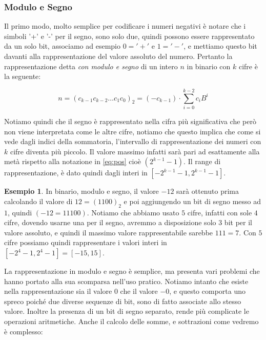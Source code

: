 \documentclass[a4paper]{book}
\theoremstyle{definition}
\newtheorem{ex}{Esempio}
\newcommand{\nota}[1]{\marginpar[{\raggedleft\small\sffamily #1\\}]{%
 								 {\raggedright\small\sffamily #1\\}}}
\begin{document}
\subsubsection{Modulo e Segno}

Il primo modo, molto semplice per codificare i numeri negativi è notare che i simboli '+' e '-' per il segno, sono solo due, quindi possono essere rappresentato da un solo bit, associamo ad esempio $0 = '+'$ e $1 = '-'$, e mettiamo questo bit davanti alla rappresentazione del valore assoluto del numero. Pertanto la rappresentazione detta \emph{con modulo e segno} di un intero $n$ in binario con $k$ cifre è la seguente:

\[ n = (c_{k-1}c_{k-2}{\ldots}c_1c_0)_2 = (-c_{k-1}) \cdot \sum_{i=0}^{k-2}c_iB^i \]

Notiamo quindi che il segno è rappresentato nella cifra più significativa che però non viene interpretata come le altre cifre, notiamo che questo implica che come si vede dagli indici della sommatoria, l'intervallo di rappresentazione dei numeri con $k$ cifre diventa più piccolo. Il valore massimo infatti sarà pari ad esattamente alla metà rispetto alla notazione in \eqref{eq:pos} cioè $(2^{k-1}-1)$. Il range di rappresentazione\nota{Numeri Interi in Modulo e Segno, con $k$ bit: Range = $[-2^{k-1}-1,2^{k-1}-1]$}, è dato quindi dagli interi in $[-2^{k-1}-1,2^{k-1}-1]$.

\begin{ex} In binario, modulo e segno, il valore $-12$ sarà ottenuto prima
calcolando il valore di $12 = (1100)_2$ e poi aggiungendo un bit di segno messo
ad $1$, quindi $(-12 = 11100)$. Notiamo che abbiamo usato $5$ cifre, infatti
con sole $4$ cifre, dovendo usarne una per il segno, avremmo a disposizione
solo $3$ bit per il valore assoluto, e quindi il massimo valore rappresentabile
sarebbe $111 = 7$. Con $5$ cifre possiamo quindi rappresentare i valori interi
in $[-2^4-1,2^4-1] = [-15,15]$. \end{ex}

La rappresentazione in modulo e segno è semplice, ma presenta vari problemi che hanno portato alla sua scomparsa nell'uso pratico. Notiamo intanto che esiste nella rappresentazione sia il valore $0$ che il valore $-0$, e questo comporta uno spreco poiché due diverse sequenze di bit, sono di fatto associate allo stesso valore. Inoltre la presenza di un bit di segno separato, rende più complicate le operazioni aritmetiche. Anche il calcolo delle somme, e sottrazioni come vedremo è complesso:
\end{document}
